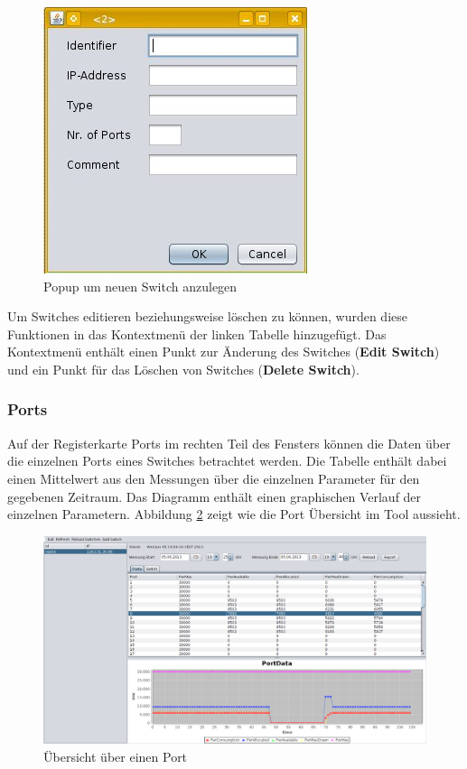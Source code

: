  \begin{figure}[h]
    \centering
    \leavevmode
    \includegraphics[scale=0.5]{figures/screenshot3}
    \caption{Popup um neuen Switch anzulegen}
    \label{fig:popup}
\end{figure}

Um Switches editieren beziehungsweise löschen zu können, wurden diese Funktionen in das Kontextmenü der linken Tabelle hinzugefügt. Das Kontextmenü enthält einen Punkt zur Änderung des Switches (\textbf{Edit Switch}) und ein Punkt für das Löschen von Switches (\textbf{Delete Switch}).

\subsubsection{Ports}
\label{sub:ports}
Auf der Registerkarte Ports im rechten Teil des Fensters können die Daten über die einzelnen Ports eines Switches betrachtet werden. Die Tabelle enthält dabei einen Mittelwert aus den Messungen über die einzelnen Parameter für den gegebenen Zeitraum. Das Diagramm enthält einen graphischen Verlauf der einzelnen Parametern. Abbildung \ref{fig:overview-port} zeigt wie die Port Übersicht im Tool aussieht.

\begin{figure}[h]
    \centering
    \leavevmode
    \includegraphics[width=1.0\linewidth]{figures/portDetails}
    \caption{Übersicht über einen Port}
    \label{fig:overview-port}
\end{figure}


